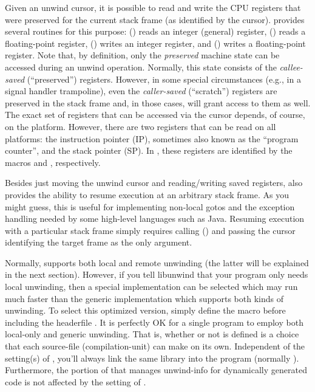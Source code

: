 \documentclass{article}
\begin{document}
Given an unwind cursor, it is possible to read and write the CPU
registers that were preserved for the current stack frame (as
identified by the cursor).   provides several routines
for this purpose: () reads an integer (general)
register, () reads a floating-point register,
() writes an integer register, and
() writes a floating-point register.  Note that,
by definition, only the \emph{preserved} machine state can be accessed
during an unwind operation.  Normally, this state consists of the
\emph{callee-saved} (``preserved'') registers.  However, in some
special circumstances (e.g., in a signal handler trampoline), even the
\emph{caller-saved} (``scratch'') registers are preserved in the stack
frame and, in those cases,  will grant access to them
as well.  The exact set of registers that can be accessed via the
cursor depends, of course, on the platform.  However, there are two
registers that can be read on all platforms: the instruction pointer
(IP), sometimes also known as the ``program counter'', and the stack
pointer (SP).  In , these registers are identified by
the macros  and ,
respectively.

Besides just moving the unwind cursor and reading/writing saved
registers,  also provides the ability to resume
execution at an arbitrary stack frame.  As you might guess, this is
useful for implementing non-local gotos and the exception handling
needed by some high-level languages such as Java.  Resuming execution
with a particular stack frame simply requires calling
() and passing the cursor identifying the target
frame as the only argument.

Normally,  supports both local and remote unwinding
(the latter will be explained in the next section).  However, if you
tell libunwind that your program only needs local unwinding, then a
special implementation can be selected which may run much faster than
the generic implementation which supports both kinds of unwinding.  To
select this optimized version, simply define the macro
 before including the headerfile
.  It is perfectly OK for a single program to
employ both local-only and generic unwinding.  That is, whether or not
 is defined is a choice that each source-file
(compilation-unit) can make on its own.  Independent of the setting(s)
of , you'll always link the same library into
the program (normally ).  Furthermore, the
portion of  that manages unwind-info for dynamically
generated code is not affected by the setting of
.
\end{document}
